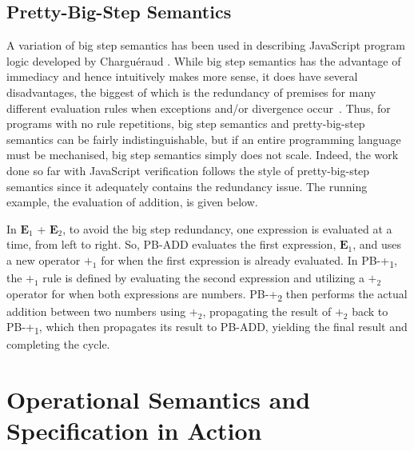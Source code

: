 \documentclass[a4paper,11pt,twoside]{report}
\begin{document}
\subsection{Pretty-Big-Step Semantics}
A variation of big step semantics has been used in describing JavaScript program logic \cite{Bodin:2014} developed by Chargu\'eraud \cite{chargueraud-13-pretty}. While big step semantics has the advantage of immediacy and hence intuitively makes more sense, it does have several disadvantages, the biggest of which is the redundancy of premises for many different evaluation rules when exceptions and/or divergence occur~\cite{chargueraud-13-pretty}. Thus, for programs with no rule repetitions, big step semantics and pretty-big-step semantics can be fairly indistinguishable, but if an entire programming language must be mechanised, big step semantics simply does not scale. Indeed, the work done so far with JavaScript verification follows the style of pretty-big-step semantics since it adequately contains the redundancy issue. The running example, the evaluation of addition, is given below. 

In $\mathbf{E}_1$ + $\mathbf{E}_2$, to avoid the big step redundancy, one expression is evaluated at a time, from left to right. So, PB-ADD evaluates the first expression, $\mathbf{E}_1$, and uses a new operator $+_1$ for when the first expression is already evaluated. In PB-+\textsubscript{1}, the $+_1$ rule is defined by evaluating the second expression and utilizing a $+_2$ operator for when both expressions are numbers. PB-+\textsubscript{2} then performs the actual addition between two numbers using $+_2$, propagating the result of $+_2$ back to PB-+\textsubscript{1}, which then propagates its result to PB-ADD, yielding the final result and completing the cycle. 

\section{Operational Semantics and Specification in Action}\label{sec:opsemac}
\end{document}
